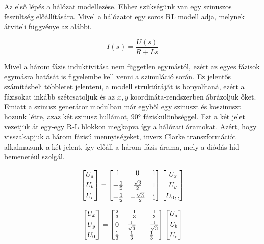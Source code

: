 Az első lépés a hálózat modellezése. Ehhez szükségünk van egy szinuszos feszültség előállítására. Mivel a hálózatot egy soros RL modell adja, melynek átviteli függvénye az alábbi.


\begin{equation}
I(s) = \frac{U(s)}{R+Ls}
\end{equation}

Mivel a három fázis induktivitása nem független egymástól, ezért az egyes fázisok egymásra hatását is figyelembe kell venni a szimuláció során. Ez jelentős számításbeli többletet jelenteni, a modell struktúráját is bonyolítaná, ezért a fázisokat inkább szétcsatoljuk és az $x,y$ koordináta-rendszerben ábrázoljuk őket. Emiatt a szinusz generátor modulban már egyből egy szinuszt és koszinuszt hozunk létre, azaz két szinusz hullámot, $90°$ fáziskülönbséggel. Ezt a két jelet vezetjük át egy-egy R-L blokkon megkapva így a hálózati áramokat. Azért, hogy visszakapjuk a három fázisú mennyiségeket, inverz Clarke transzformációt alkalmazunk a két jelent, így előáll a három fázis árama, mely a diódás híd bemenetéül szolgál.

\begin{equation}
\centering
\begin{bmatrix}
       U_a\\[0.3em]
       U_b\\[0.3em]
       U_c          
\end{bmatrix}
=
\begin{bmatrix}
       1 & 0 & 1  \\[0.3em]
       -\frac{1}{2} & \frac{\sqrt{3}}{2} & 1  \\[0.3em]
       -\frac{1}{2} & -\frac{\sqrt{3}}{2} & 1 
\end{bmatrix}
\begin{bmatrix}
       U_x\\[0.3em]
       U_y\\[0.3em]
       U_0,,        
\end{bmatrix}    
\end{equation}

\begin{equation}
\centering
\begin{bmatrix}
       U_x\\[0.3em]
       U_y\\[0.3em]
       U_0 
\end{bmatrix}
=
\begin{bmatrix}
       \frac{2}{3} & -\frac{1}{3} & -\frac{1}{3}  \\[0.3em]
       0 & \frac{1}{\sqrt{3}} & -\frac{1}{\sqrt{3}}  \\[0.3em]
       \frac{1}{3} & \frac{1}{3} & \frac{1}{3}    
\end{bmatrix}
\begin{bmatrix}
       U_a\\[0.3em]
       U_b\\[0.3em]
       U_c    
\end{bmatrix}
\end{equation}

